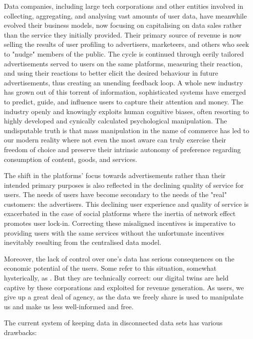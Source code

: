 Data companies, including large tech corporations and other entities involved in collecting, aggregating, and analysing vast amounts of user data, have meanwhile evolved their business models, now focusing on capitalising on data sales rather than the service they initially provided. Their primary source of revenue is now selling the results of user profiling to advertisers, marketeers, and others who seek to "nudge" members of the public. The cycle is continued through eerily tailored advertisements served to users on the same platforms, measuring their reaction, and using their reactions to better elicit the desired behaviour in future advertisements, thus creating an unending feedback loop. A whole new industry has grown out of this torrent of information, sophisticated systems have emerged to predict, guide, and influence users to capture their attention and money. The industry openly and knowingly exploits human cognitive biases, often resorting to highly developed and cynically calculated psychological manipulation. The undisputable truth is that mass manipulation in the name of commerce has led to our modern reality where not even the most aware can truly exercise their freedom of choice and preserve their intrinsic autonomy of preference regarding consumption of content, goods, and services.

The shift in the platforms' focus towards advertisements rather than their intended primary purposes is also reflected in the declining quality of service for users. The needs of users have become secondary to the needs of the "real" customers: the advertisers. This declining user experience and quality of service is exacerbated in the case of social platforms where the inertia of network effect promotes user lock-in. Correcting these misaligned incentives is imperative to providing users with the same services without the unfortunate incentives inevitably resulting from the centralised data model.

Moreover, the lack of control over one's data has serious consequences on the economic potential of the users. Some refer to this situation, somewhat hysterically, as . But they are technically correct: our digital twins are held captive by these corporations and exploited for revenue generation. As users, we give up a great deal of agency, as the data we freely share is used to manipulate us and make us less well-informed and free. 

The current system of keeping data in disconnected data sets has various drawbacks: 


